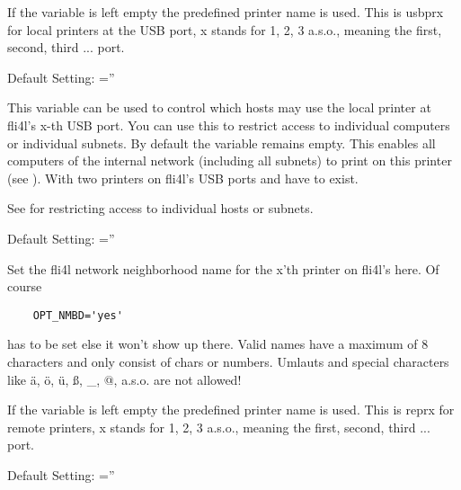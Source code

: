 \begin{description}
    If the variable is left empty the predefined printer name is used. This is
    usbprx for local printers at the USB port, x stands for 1, 2, 3 a.s.o., meaning the
    first, second, third ... port.

    Default Setting: =''


    This variable can be used to control which hosts may use the local
    printer at fli4l's x-th USB port. You can use this to restrict access
    to individual computers or individual subnets. By default the variable remains empty.
    This enables all computers of the internal network (including all subnets) to print
    on this printer (see ). With
    two printers on fli4l's USB ports
    \textbf{} and
    \textbf{} have to exist.

    See  for restricting
    access to individual hosts or subnets.

    Default Setting: =''



    Set the fli4l network neighborhood name for the x'th printer on fli4l's
     here. Of course

\begin{example}
\begin{verbatim}
    OPT_NMBD='yes'
\end{verbatim}
\end{example}

    has to be set else it won't show up there. Valid names have a maximum of 8 characters
    and only consist of chars or numbers. Umlauts and special characters like ä, ö, ü,
    ß, \_, @, a.s.o. are not allowed!

    If the variable is left empty the predefined printer name is used. This is
    reprx for remote printers, x stands for 1, 2, 3 a.s.o., meaning the
    first, second, third ... port.

    Default Setting: =''




\end{description}
